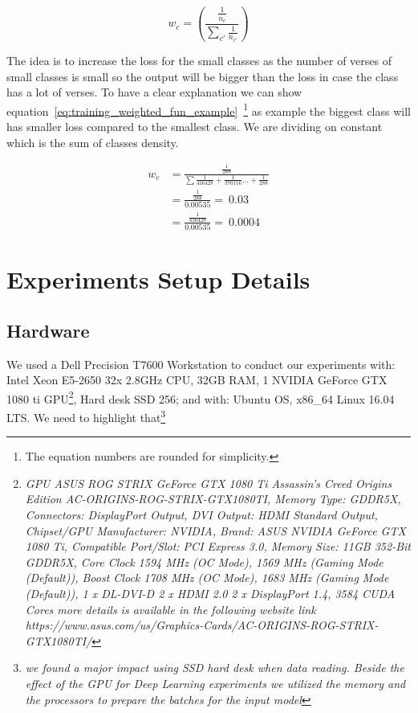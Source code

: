 \begin{equation}\label{eq:training_weighted_fun}
  w_c = \left(\frac{\frac{1}{n_c}}{\sum_{c'} \frac{1}{n_{c'}}} \right)
\end{equation}

The idea is to increase the loss for the small classes as the number of verses of small classes is small so the output will be bigger than the loss in case the class has a lot of verses. To have a clear explanation we can show equation~\ref{eq:training_weighted_fun_example}~\footnote{The equation numbers are rounded for simplicity.} as example the biggest class will has smaller loss compared to the smallest class. We are dividing on constant which is the sum of classes density. 

\begin{subequations}
\begin{align}
  w_c &=  \frac{\frac{1}{288}}{\sum\frac{1}{416428}+\frac{1}{370116}\dots+\frac{1}{288}}\\
      &= \frac{\frac{1}{288}}{0.00535} = ~0.03 \\
        &= \frac{\frac{1}{416428}}{0.00535} = ~0.0004
\end{align}\label{eq:training_weighted_fun_example}
\end{subequations}

\section{Experiments Setup Details}

\subsection{Hardware}

We used a Dell Precision T7600 Workstation to conduct our experiments with: Intel Xeon E5-2650 32x 2.8GHz CPU, 32GB RAM, 1 NVIDIA GeForce GTX 1080 ti GPU\footnote{\textit{GPU ASUS ROG STRIX GeForce GTX 1080 Ti Assassin's Creed Origins Edition AC-ORIGINS-ROG-STRIX-GTX1080TI, Memory Type: GDDR5X, Connectors: DisplayPort Output, DVI Output: HDMI Standard Output, Chipset/GPU Manufacturer: NVIDIA, Brand: ASUS NVIDIA GeForce GTX 1080 Ti, Compatible Port/Slot: PCI Express 3.0, Memory Size: 11GB 352-Bit GDDR5X, Core Clock 1594 MHz (OC Mode), 1569 MHz (Gaming Mode (Default)), Boost Clock 1708 MHz (OC Mode), 1683 MHz (Gaming Mode (Default)), 1 x DL-DVI-D 2 x HDMI 2.0 2 x DisplayPort 1.4, 3584 CUDA Cores more details is available in the following website link https://www.asus.com/us/Graphics-Cards/AC-ORIGINS-ROG-STRIX-GTX1080TI/} }, Hard desk SSD 256; and with: Ubuntu OS, x86\_64 Linux 16.04 LTS. We need to highlight that\footnote{\textit{we found a major impact using SSD hard desk when data reading. Beside the effect of the GPU for Deep Learning experiments we utilized the memory and the processors to prepare the batches for the input model}}


